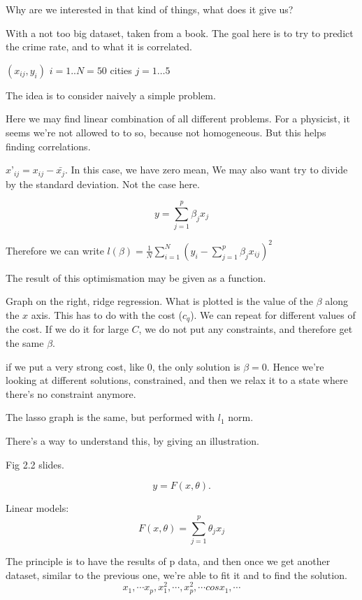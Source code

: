 \documentclass[a4paper]{tufte-book}
\begin{document}
Why are we interested in that kind of things, what does it give us?

With a not too big dataset, taken from a book. The goal here is to try to predict the crime rate, and to what it is correlated.

$(x_{ij}, y_i)$ $i=1..N=50$ cities
$j=1…5$

The idea is to consider naively a simple problem.

Here we may find linear combination of all different problems. For a physicist, it seems we’re not allowed to to so, because not homogeneous. But this helps finding correlations.

$x’_{ij} = x_{ij} - \bar{x_j}$. In this case, we have zero mean, We may also want try to divide by the standard deviation. Not the case here.

\begin{equation}
y=\sum_{j=1}^p \beta_j x_j
\end{equation}

Therefore we can write $l(\beta) = \frac{1}{N} \sum_{i=1}^N (y_i - \sum_{j=1}^p \beta_j x_{ij})^2$

The result of this optimismation may be given as a function.

Graph on the right, ridge regression.
What is plotted is the value of the $\beta$ along the $x$ axis. This has to do with the cost ($c_q$). 
We can repeat for different values of the cost.
If we do it for large $C$, we do not put any constraints, and therefore get the same $\beta$.

if we put a very strong cost, like 0, the only solution is $\beta = 0$.
Hence we’re looking at different solutions, constrained, and then we relax it to a state where there’s no constraint anymore.

The lasso graph is the same, but performed with $l_1$ norm.

There’s a way to understand this, by giving an illustration.

Fig 2.2 slides.


\begin{equation}
y=F(x,\theta).
\end{equation}

Linear models:
\begin{equation}
F(x,\theta) = \sum_{j=1}^p \theta_j x_j
\end{equation}

The principle is to have the results of p data, and then once we get another dataset, similar to the previous one, we’re able to fit it and to find the solution.
\begin{equation}
x_1, \cdots x_p, x_1^2, \cdots, x_p^2, \cdots cos x_1, \cdots
\end{equation}
\end{document}
